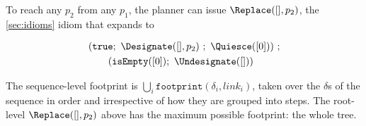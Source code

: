 To reach any \(p_2\) from any \(p_1\), the planner can issue \(\Replace([], p_2)\), the \cref{sec:idioms} idiom that expands to

\[
\begin{array}{@{}l@{}}
(\mathtt{true};\ \Designate([], p_2)\ ;\ \Quiesce([0]))\ ;\\[3pt]
\qquad (\mathtt{isEmpty}([0]);\ \Undesignate([]))
\end{array}
\]

The sequence-level footprint is \(\bigcup_i \mathtt{footprint}(\delta_i, \mathit{link}_i)\), taken over the \(\delta\)s of the sequence in order and irrespective of how they are grouped into steps.
The root-level \(\Replace([], p_2)\) above has the maximum possible footprint: the whole tree.




